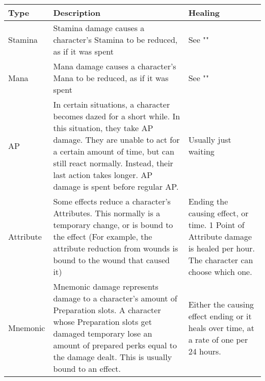 \begin{longtable}{l p{5cm} p{5cm}}
Type & Description & Healing \\ \hline
Stamina & Stamina damage causes a character's Stamina to be reduced, as if it was spent & See "\nameref{subsec:recoverStamina}" \\
Mana & Mana damage causes a character's Mana to be reduced, as if it was spent & See "\nameref{subsec:recoverStamina}" \\
AP & In certain situations, a character becomes dazed for a short while. In this situation, they take AP damage. They are unable to act for a certain amount of time, but can still react normally. Instead, their last action takes longer. AP damage is spent before regular AP. & Usually just waiting\\
Attribute & Some effects reduce a character's Attributes. This normally is a temporary change, or is bound to the effect (For example, the attribute reduction from wounds is bound to the wound that caused it) & Ending the causing effect, or time. 1 Point of Attribute damage is healed per hour. The character can choose which one.\\
Mnemonic & Mnemonic damage represents damage to a character's amount of Preparation slots. A character whose Preparation slots get damaged temporary lose an amount of prepared perks equal to the damage dealt. This is usually bound to an effect. & Either the causing effect ending or it heals over time, at a rate of one per 24 hours.\\
\end{longtable}
